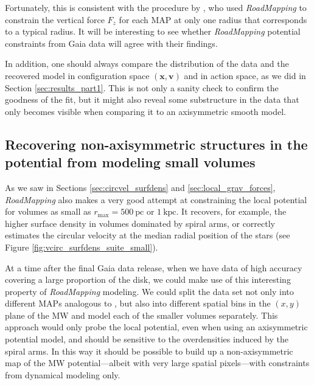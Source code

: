 \documentclass[iop,revtex4,numberedappendix,appendixfloats]{emulateapj}
\newcommand{\vect}[1]{\boldsymbol{#1}}
\newcommand{\RM}{{\sl RoadMapping}}
\newcommand{\NEW}[1]{\textcolor{Green}{#1}}
\newcommand{\OLD}[1]{}
\begin{document}
Fortunately, this is consistent with the procedure by \citet{2013ApJ...779..115B}, who used \RM{} to constrain the vertical force $F_z$ for each MAP at only one radius that corresponds to a typical radius. It will be interesting to see whether \RM{} potential constraints from Gaia data will agree with their findings.

In addition, one should always compare the distribution of the data and the recovered model in configuration space $(\vect{x},\vect{v})$ and in action space, as we did in Section \ref{sec:results_part1}. This is not only a sanity check to confirm the goodness of the fit, but it might also reveal some substructure in the data that only becomes visible when comparing it to an axisymmetric smooth model.

\subsection{Recovering non-axisymmetric structures in the potential from modeling small volumes}

As we saw in Sections \ref{sec:circvel_surfdens} and \OLD{\ref{sec:forces_bias}}\NEW{\ref{sec:local_grav_forces}}, \RM{} also makes a very good attempt at constraining the local potential for volumes as small as $r_\text{max}=500~\text{pc}$ or $1~\text{kpc}$. It recovers, for example, the higher surface density in volumes dominated by spiral arms, or correctly estimates the circular velocity at the median radial position of the stars (see Figure \ref{fig:vcirc_surfdens_suite_small}). 

At a time after the final Gaia data release, when we have data of high accuracy covering a large proportion of the disk, we could make use of this interesting property of \RM{} modeling. We could split the data set not only into different MAPs analogous to \citet{2013ApJ...779..115B}, but also into different spatial bins in the $(x,y)$ plane of the MW and model each of the smaller volumes separately. This approach would only probe the local potential, even when using an axisymmetric potential model, and should be sensitive to the overdensities induced by the spiral arms. In this way it should be possible to build up a non-axisymmetric map of the MW potential---albeit with very large spatial pixels---with constraints from dynamical modeling only.

\end{document}
